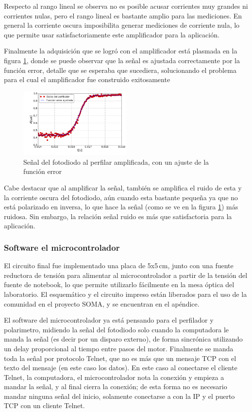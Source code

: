 Respecto al rango lineal se observa no es posible acusar corrientes muy grandes ni corrientes nulas, pero el rango lineal es bastante amplio para las mediciones. En general la corriente oscura imposibilita generar mediciones de corriente nula, lo que permite usar satisfactoriamente este amplificador para la aplicación.

Finalmente la adquisición que se logró con el amplificador está plasmada en la figura \ref{fig:circuito/amp/perfilacion_ajuste}, donde se puede observar que la señal es ajustada correctamente por la función error, detalle que se esperaba que sucediera, solucionando el problema para el cual el amplificador fue construido exitosamente

\begin{figure}[H]
    \centering
    \includegraphics[width=0.5\textwidth]{fig/perfilador/fit_data_plastico_subida}
    \caption{Señal del fotodiodo al perfilar amplificada, con un ajuste de la función error}
    \label{fig:circuito/amp/perfilacion_ajuste}
\end{figure}
Cabe destacar que al amplificar la señal, también se amplifica el ruido de esta y la corriente oscura del fotodiodo, aún cuando esta bastante pequeña ya que no está polarizado en inversa, lo que hace la señal (como se ve en la figura \ref{fig:circuito/amp/perfilacion_ajuste}) más ruidosa. Sin embargo, la relación señal ruido es más que satisfactoria para la aplicación.

\subsubsection{Software el microcontrolador}
El circuito final fue implementado una placa de 5x5$\,$cm, junto con una fuente reductora de tensión para alimentar al microcontrolador a partir de la tensión del fuente de notebook, lo que permite utilizarlo fácilmente en la mesa óptica del laboratorio. El esquemático y el circuito impreso están liberados para el uso de la comunidad en el proyecto SOMA, y se encuentran en el apéndice.

El software del microcontrolador ya está pensando para el perfilador y polarimetro, midiendo la señal del fotodiodo solo cuando la computadora le manda la señal (es decir por un disparo externo), de forma sincrónica utilizando un delay proporcional al tiempo entre pasos del motor. Finalmente se manda toda la señal por protocolo Telnet, que no es más que un mensaje TCP con el texto del mensaje (en este caso los datos). En este caso al conectarse el cliente Telnet, la computadora, el microcontrolador nota la conexión y empieza a mandar la señal, y al final cierra la conexión; de esta forma no es necesario mandar ninguna señal del inicio, solamente conectarse a con la IP y el puerto TCP con un cliente Telnet.

